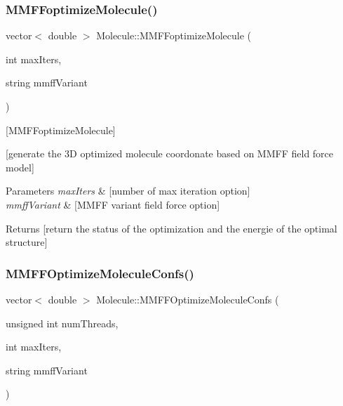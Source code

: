 \subsubsection{\texorpdfstring{M\+M\+F\+Foptimize\+Molecule()}{MMFFoptimizeMolecule()}\hspace{0.1cm}{\footnotesize\ttfamily [2/2]}}
{\footnotesize\ttfamily vector$<$ double $>$ Molecule\+::\+M\+M\+F\+Foptimize\+Molecule (\begin{DoxyParamCaption}\item[{int}]{max\+Iters,  }\item[{string}]{mmff\+Variant }\end{DoxyParamCaption})}



\mbox{[}M\+M\+F\+Foptimize\+Molecule\mbox{]} 

\mbox{[}generate the 3D optimized molecule coordonate based on M\+M\+FF field force model\mbox{]}


\begin{DoxyParams}{Parameters}
{\em max\+Iters} & \mbox{[}number of max iteration option\mbox{]} \\
\hline
{\em mmff\+Variant} & \mbox{[}M\+M\+FF variant field force option\mbox{]} \\
\hline
\end{DoxyParams}
\begin{DoxyReturn}{Returns}
\mbox{[}return the status of the optimization and the energie of the optimal structure\mbox{]} 
\end{DoxyReturn}
\mbox{\label{class_molecule_a839e0ee89e2355a5451cd0f8fdff0a90}} 
\subsubsection{\texorpdfstring{M\+M\+F\+F\+Optimize\+Molecule\+Confs()}{MMFFOptimizeMoleculeConfs()}}
{\footnotesize\ttfamily vector$<$ double $>$ Molecule\+::\+M\+M\+F\+F\+Optimize\+Molecule\+Confs (\begin{DoxyParamCaption}\item[{unsigned int}]{num\+Threads,  }\item[{int}]{max\+Iters,  }\item[{string}]{mmff\+Variant }\end{DoxyParamCaption})}



